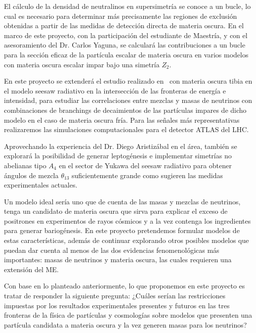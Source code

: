 \begin{darkmatter}
  El cálculo de la densidad de neutralinos en supersimetría se conoce
  a un bucle, lo cual es necesario para determinar más precisamente las
  regiones de exclusión obtenidas a partir de las medidas de detección
  directa de materia oscura. En el marco de este proyecto,
  con la participación del estudiante de Maestría, y con el
  asesoramiento del Dr. Carlos Yaguna, se 
  calculará las contribuciones a un bucle  para la sección eficaz de la
  partícula escalar de materia oscura en varios  modelos con materia oscura
  escalar impar bajo una simetría $Z_2$.

  En este proyecto se extenderá el estudio realizado
  en~\cite{Sierra:2008wj} con materia oscura tibia en el modelo seesaw
  radiativo en la intersección de las fronteras de energía e
  intensidad, para estudiar las correlaciones entre mezclas y masas de
  neutrinos con combinaciones de branchings de decaimientos de las
  partículas impares de dicho modelo en el caso de materia oscura
  fría. Para las señales más representativas realizaremos las
  simulaciones computacionales para el detector ATLAS del LHC.
\end{darkmatter}



\begin{leptogenesis}
  Aprovechando la experiencia del Dr. Diego Aristizábal en el área,
  también se explorará la posibilidad de generar leptogénesis e
  implementar simetrías no abelianas tipo $A_4$ en el sector de Yukawa
  del seesaw radiativo para obtener ángulos de mezcla $\theta_{13}$
  suficientemente grande como sugieren las medidas experimentales
  actuales.
\end{leptogenesis}

Un modelo ideal sería uno que de cuenta de las masas y mezclas de
neutrinos, tenga un candidato de materia oscura que sirva para explicar
el exceso de positrones en experimentos de rayos cósmicos y a la vez
contenga los ingredientes para generar bariogénesis.  En este
proyecto pretendemos formular modelos de estas características, además
de continuar explorando otros posibles modelos que puedan dar cuenta
al menos de las dos evidencias fenomenológicas más importantes: masas
de neutrinos y materia oscura, las cuales requieren una extensión del
ME.


Con base en lo planteado anteriormente, lo que proponemos en este
proyecto es tratar de responder la siguiente pregunta: ¿Cuáles serían
las restricciones impuestas por los resultados experimentales
presentes y futuros en las tres fronteras de la física de partículas y
cosmologías sobre modelos que presenten una partícula candidata a
materia oscura y la vez generen masas para los neutrinos?
 

